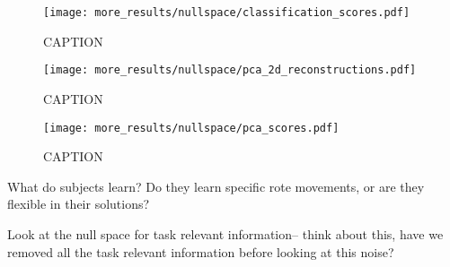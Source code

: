 \documentclass[../main.tex]{subfiles}
\begin{document}
\begin{figure}[tph]
  \centering
    \texttt{[image: more\_results/nullspace/classification\_scores.pdf]}
    \caption[classification scores]{CAPTION}\label{fig:classification_scores}
\end{figure}

\begin{figure}[tph]
  \centering
    \texttt{[image: more\_results/nullspace/pca\_2d\_reconstructions.pdf]}
    \caption[PCA projections of null space into two dimensions]{CAPTION}\label{fig:pca_null}
\end{figure}

\begin{figure}[tph]
  \centering
    \texttt{[image: more\_results/nullspace/pca\_scores.pdf]}
    \caption[Classification scores of PCA reconstructions]{CAPTION}\label{fig:pca_scores}
\end{figure}


What do subjects learn? Do they learn specific rote movements, or are they flexible in their solutions?

Look at the null space for task relevant information-- think about this, have we removed all the task relevant information before looking at this noise?




\end{document}
